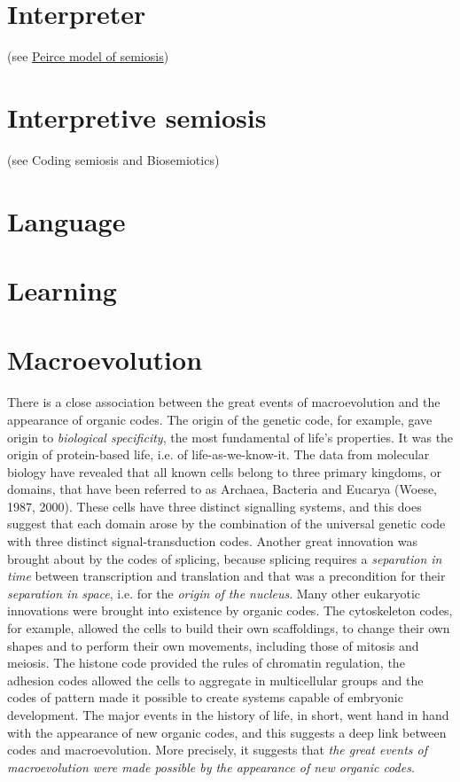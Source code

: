 \documentclass[12pt]{article}
\begin{document}
\section{Interpreter} (see \hyperlink{peirce_model_of_semiosis}{Peirce model of semiosis})


\section{Interpretive semiosis} (see Coding semiosis and Biosemiotics)

\hypertarget{language}{}
\section{Language}

\hypertarget{learning}{}
\section{Learning}

\section{Macroevolution} 
There is a close association between the great events of macroevolution and the appearance of organic codes. The origin of the genetic code, for example, gave origin to \textit{biological specificity}, the most fundamental of life's properties. It was the origin of protein-based life, i.e. of life-as-we-know-it. The data from molecular biology have revealed that all known cells belong to three primary kingdoms, or domains, that have been referred to as Archaea, Bacteria and Eucarya (Woese, 1987, 2000). These cells have three distinct signalling systems, and this does suggest that each domain arose by the combination of the universal genetic code with three distinct signal-transduction codes. Another great innovation was brought about by the codes of splicing, because splicing requires a \textit{separation in time} between transcription and translation and that was a precondition for their \textit{separation in space}, i.e. for the \textit{origin of the nucleus}. Many other eukaryotic innovations were brought into existence by organic codes. The cytoskeleton codes, for example, allowed the cells to build their own scaffoldings, to change their own shapes and to perform their own movements, including those of mitosis and meiosis. The histone code provided the rules of chromatin regulation, the adhesion codes allowed the cells to aggregate in multicellular groups and the codes of pattern made it possible to create systems capable of embryonic development. The major events in the history of life, in short, went hand in hand with the appearance of new organic codes, and this suggests a deep link between codes and macroevolution. More precisely, it suggests that \textit{the great events of macroevolution were made possible by the appearance of new organic codes}. 
\end{document}
